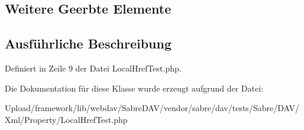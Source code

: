 \subsection*{Weitere Geerbte Elemente}


\subsection{Ausführliche Beschreibung}


Definiert in Zeile 9 der Datei Local\+Href\+Test.\+php.



Die Dokumentation für diese Klasse wurde erzeugt aufgrund der Datei\+:\begin{DoxyCompactItemize}
\item 
Upload/framework/lib/webdav/\+Sabre\+D\+A\+V/vendor/sabre/dav/tests/\+Sabre/\+D\+A\+V/\+Xml/\+Property/Local\+Href\+Test.\+php\end{DoxyCompactItemize}
